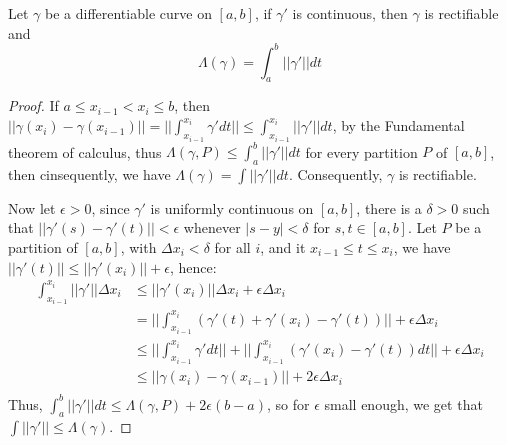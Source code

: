 \begin{theorem}\label{7.5.1}
    Let $\gamma$ be a differentiable curve on  $[a,b]$, if  $\gamma'$ is
    continuous, then  $\gamma$ is rectifiable and
        \begin{equation}
            \Lambda(\gamma)=\int_{a}^{b}{||\gamma'|| dt}		
        \end{equation} 
\end{theorem}
\begin{proof}
    If $a \leq x_{i-1}<x_i \leq b$, then
    $||\gamma(x_i)-\gamma(x_{i-1})||=||\int_{x_{i-1}}^{x_i}{\gamma' dt}|| \leq
    \int_{x_{i-1}}^{x_i}{||\gamma'|| dt}$, by the Fundamental theorem of
    calculus, thus $\Lambda(\gamma,P) \leq \int_{a}^{b}{||\gamma'|| dt}$ 
    for every partition $P$ of  $[a,b]$, then cinsequently, we have
    $\Lambda(\gamma)=\int{||\gamma'|| dt}$. Consequently, $\gamma$ is
    rectifiable.

    Now let  $\epsilon>0$, since  $\gamma'$ is uniformly continuous on  $[a,b]$,
    there is a  $\delta>0$ such that  $||\gamma'(s)-\gamma'(t)||<\epsilon$
    whenever  $|s-y|<\delta$ for  $s,t \in [a,b]$. Let $P$ be a partition of
    $[a,b]$, with  $\Delta{x_i}<\delta$ for all  $i$, and it  $x_{i-1} \leq t
    \leq x_i$, we have  $||\gamma'(t)|| \leq ||\gamma'(x_i)||+\epsilon$, hence:
        \begin{align*}
            \int_{x_{i-1}}^{x_i}{||\gamma'||\Delta{x_i}} &\leq ||\gamma'(x_i)||\Delta{x_i}+\epsilon\Delta{x_i} \\ 
                &= ||\int_{x_{i-1}}^{x_i}{(\gamma'(t)+\gamma'(x_i)-\gamma'(t))}||+\epsilon\Delta{x_i} \\
                &\leq ||\int_{x_{i-1}}^{x_i}{\gamma' dt}||+||\int_{x_{i-1}}^{x_i}{(\gamma'(x_i)-\gamma'(t)) dt}||+\epsilon\Delta{x_i} \\
                & \leq ||\gamma(x_i)-\gamma(x_{i-1})||+2\epsilon\Delta{x_i} \\
        \end{align*}
    Thus, $\int_{a}^{b}{||\gamma'|| dt} \leq \Lambda(\gamma,P)+2\epsilon(b-a)$, 
    so for  $\epsilon$ small enough, we get that  $\int{||\gamma'||} \leq \Lambda(\gamma)$.
\end{proof}
